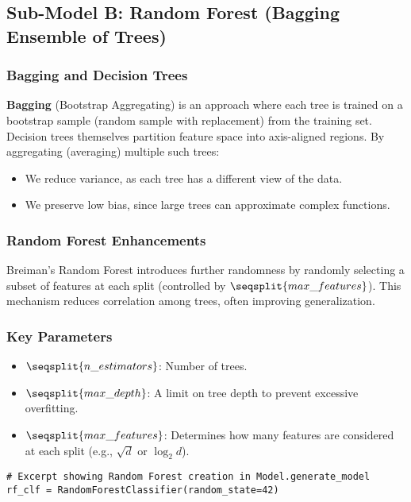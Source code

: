 \documentclass[12pt]{article}
\begin{document}
\subsection{Sub-Model B: Random Forest (Bagging Ensemble of Trees)}

\subsubsection{Bagging and Decision Trees}
\textbf{Bagging} (Bootstrap Aggregating) is an approach where each tree is trained on a bootstrap sample (random sample with replacement) from the training set. Decision trees themselves partition feature space into axis-aligned regions. By aggregating (averaging) multiple such trees:
\begin{itemize}[noitemsep]
    \item We reduce variance, as each tree has a different view of the data.
    \item We preserve low bias, since large trees can approximate complex functions.
\end{itemize}

\subsubsection{Random Forest Enhancements}
Breiman’s Random Forest introduces further randomness by randomly selecting a subset of features at each split (controlled by \(\seqsplit{max\_features}\)). This mechanism reduces correlation among trees, often improving generalization.

\subsubsection{Key Parameters}
\begin{itemize}[noitemsep]
    \item \(\seqsplit{n\_estimators}\): Number of trees.
    \item \(\seqsplit{max\_depth}\): A limit on tree depth to prevent excessive overfitting.
    \item \(\seqsplit{max\_features}\): Determines how many features are considered at each split (e.g., \(\sqrt{d}\) or \(\log_2 d\)).
\end{itemize}

\begin{verbatim}
# Excerpt showing Random Forest creation in Model.generate_model
rf_clf = RandomForestClassifier(random_state=42)
\end{verbatim}
\end{document}

